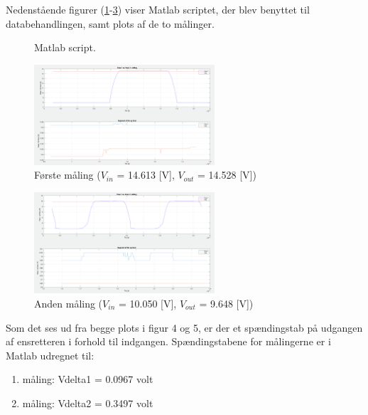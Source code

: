 Nedenstående figurer (\ref{fig:matcode2}-\ref{fig:tbil3}) viser Matlab scriptet, der blev benyttet til databehandlingen, samt plots af de to målinger.
\clearpage
\begin{figure}[h]
  \centering


  
  \caption{Matlab script.}
  \label{fig:matcode2}
\end{figure}
\clearpage
\begin{figure}[h]
  \centering
  \includegraphics[width=0.6\textwidth]{tbil2.png}
  \caption{Første måling ($V_{in}$ = 14.613 [V], $V_{out}$ = 14.528 [V])}
  \label{fig:tbil2}
\end{figure}

\begin{figure}[h]
  \centering
  \includegraphics[width=0.6\textwidth]{tbil3.png}
  \caption{Anden måling ($V_ {in}$ = 10.050 [V], $V_{out}$ = 9.648 [V])}
  \label{fig:tbil3}
\end{figure}

Som det ses ud fra begge plots i figur 4 og 5, er der et spændingstab på udgangen af ensretteren i forhold til indgangen. Spændingstabene for målingerne er i Matlab udregnet til:

\begin{enumerate}
\item måling:	Vdelta1 = 0.0967 volt
\item måling:	Vdelta2 = 0.3497 volt
\end{enumerate}


